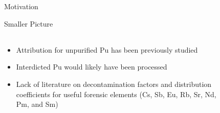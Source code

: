 \documentclass{beamer}
\newcommand{\tss}{\textsuperscript}
\begin{document}
\begin{frame}{Motivation}
\begin{itemize}
\begin{itemize}
{\begin{figure}[H]
\begin{flushright}
	\end{flushright}
      \end{figure}}
  \end{itemize}
  \end{itemize}
\end{frame}

\begin{frame}{Smaller Picture}
  \begin{columns}
    \begin{column}{0.5\textwidth}
      \vspace{-10mm}
      \begin{itemize}
      \item{Attribution for unpurified Pu has been previously studied
        \tss{\cite{chirayath2015trace,scott2005nuclear,glaser2009isotopic}}}
      \item{Interdicted Pu would likely have been processed}
      \item{Lack of literature on decontamination factors and
        distribution coefficients for useful forensic elements (Cs, Sb,
        Eu, Rb, Sr, Nd, Pm, and Sm)} 
      \end{itemize}
    \end{column}
    \begin{column}{0.5\textwidth}
      \begin{figure}[H]
        \vspace*{-1cm}
        \begin{center}

\end{center}
\end{figure}
\end{column}
\end{columns}
\end{frame}
\end{document}
